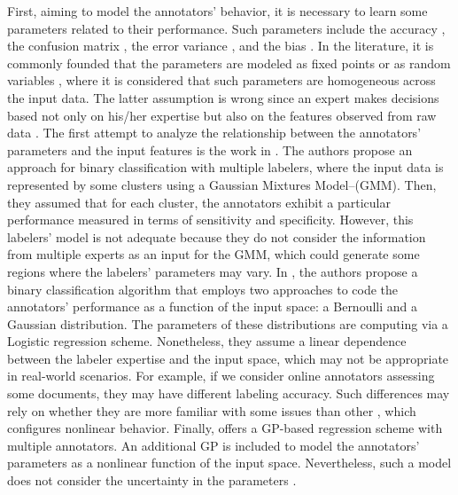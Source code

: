 \documentclass[journal]{IEEEtran}
\begin{document}
First, aiming to model the annotators' behavior, it is necessary to learn some parameters related to their performance. Such parameters include the accuracy \cite{rodrigues2013learning}, the confusion matrix \cite{gonzalez2015automatic}, the error variance \cite{raykar2010learning}, and the bias \cite{rodrigues2017learning}. In the literature, it is commonly founded that the parameters are modeled as fixed points \cite{rodrigues2014gaussian} or as random variables \cite{morales2019scalable}, where it is considered that such parameters are homogeneous across the input data. The latter assumption is wrong since an expert makes decisions based not only on his/her expertise but also on the features observed from raw data \cite{raykar2010learning}. The first attempt to analyze the relationship between the annotators' parameters and the input features is the work in \cite{zhang2011learning}. The authors propose an approach for binary classification with multiple labelers, where the input data is represented by some clusters using a Gaussian Mixtures Model--(GMM). Then, they assumed that for each cluster, the annotators exhibit a particular performance measured in terms of sensitivity and specificity. However, this labelers' model is not adequate because they do not consider the information from multiple experts as an input for the GMM, which could generate some regions where the labelers' parameters may vary. In \cite{yan2014learning}, the authors propose a binary classification algorithm that employs two approaches to code the annotators' performance as a function of the input space: a Bernoulli and a Gaussian distribution. The parameters of these distributions are computing via a Logistic regression scheme. Nonetheless, they assume a linear dependence between the labeler expertise and the input space, which may not be appropriate in real-world scenarios. For example, if we consider online annotators assessing some documents, they may have different labeling accuracy. Such differences may rely on whether they are more familiar with some issues than other \cite{wang2016bi}, which configures nonlinear behavior. Finally, \cite{xiao2013learning} offers a GP-based regression scheme with multiple annotators.  An additional GP is included to model the annotators' parameters as a nonlinear function of the input space. Nevertheless, such a model does not consider the uncertainty in the parameters \cite{bishop2006pattern}.
\end{document}
